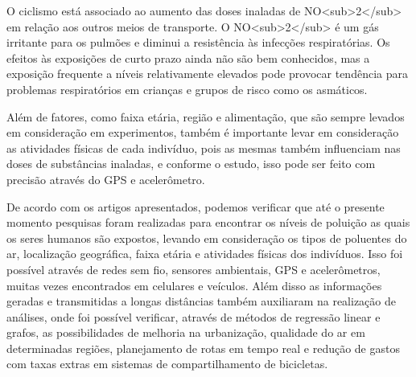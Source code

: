 O ciclismo está associado ao aumento das doses inaladas de NO<sub>2</sub> em relação aos outros meios 
de transporte. O NO<sub>2</sub> é um gás irritante para os pulmões e diminui a resistência às 
infecções respiratórias. Os efeitos às exposições de curto prazo ainda não são bem conhecidos, mas a 
exposição frequente a níveis relativamente elevados pode provocar tendência para problemas 
respiratórios em crianças e grupos de risco como os asmáticos.

Além de fatores, como faixa etária, região e alimentação, que são sempre levados em consideração em 
experimentos, também é importante levar em consideração as atividades físicas de cada indivíduo, pois 
as mesmas também influenciam nas doses de substâncias inaladas, e conforme o estudo, isso pode ser 
feito com precisão através do GPS e acelerômetro.

De acordo com os artigos apresentados, podemos verificar que até o presente momento pesquisas foram 
realizadas para encontrar os níveis de poluição as quais os seres humanos são expostos, levando em 
consideração os tipos de poluentes do ar, localização geográfica, faixa etária e atividades físicas 
dos indivíduos. Isso foi possível através de redes sem fio, sensores ambientais, GPS e acelerômetros, 
muitas vezes encontrados em celulares e veículos. Além disso as informações geradas e transmitidas a 
longas distâncias também auxiliaram na realização de análises, onde foi possível verificar, através 
de métodos de regressão linear e grafos, as possibilidades de melhoria na urbanização, qualidade do 
ar em determinadas regiões, planejamento de rotas em tempo real e redução de gastos com taxas extras 
em sistemas de compartilhamento de bicicletas.
